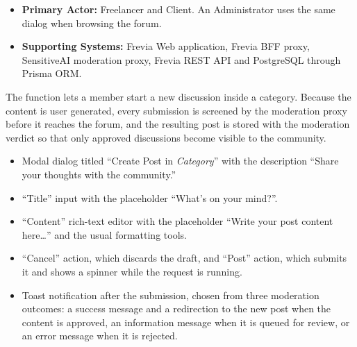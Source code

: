 
\begin{itemize}[leftmargin=1.6em,topsep=3pt,itemsep=2pt,parsep=0pt,label=$\bullet$]
      \item \textbf{Primary Actor:} Freelancer and Client. An Administrator uses the same dialog
            when browsing the forum.
      \item \textbf{Supporting Systems:} Frevia Web application, Frevia BFF proxy, SensitiveAI
            moderation proxy, Frevia REST API and PostgreSQL through Prisma ORM.
\end{itemize}

\noindent The function lets a member start a new discussion inside a category. Because the
content is user generated, every submission is screened by the moderation proxy before it
reaches the forum, and the resulting post is stored with the moderation verdict so that only
approved discussions become visible to the community.

\begin{itemize}[leftmargin=1.6em,topsep=3pt,itemsep=2pt,parsep=0pt,label=$\bullet$]
      \item Modal dialog titled ``Create Post in \textit{Category}'' with the description
            ``Share your thoughts with the community.''
      \item ``Title'' input with the placeholder ``What's on your mind?''.
      \item ``Content'' rich-text editor with the placeholder ``Write your post content here\ldots''
            and the usual formatting tools.
      \item ``Cancel'' action, which discards the draft, and ``Post'' action, which submits it and
            shows a spinner while the request is running.
      \item Toast notification after the submission, chosen from three moderation outcomes:
            a success message and a redirection to the new post when the content is
            approved, an information message when it is queued for review, or an error
            message when it is rejected.
\end{itemize}

